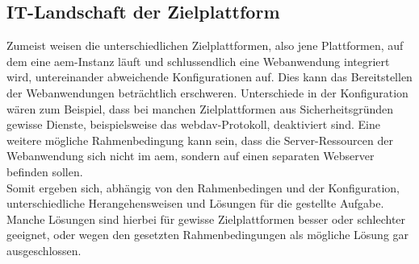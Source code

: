 \subsection{IT-Landschaft der Zielplattform}

Zumeist weisen die unterschiedlichen Zielplattformen, also jene Plattformen, auf dem eine \ac{aem}-Instanz läuft und schlussendlich eine Webanwendung integriert wird, untereinander abweichende Konfigurationen auf. Dies kann das Bereitstellen der Webanwendungen beträchtlich erschweren. Unterschiede in der Konfiguration wären zum Beispiel, dass bei manchen Zielplattformen aus Sicherheitsgründen gewisse Dienste, beispielsweise das \ac{webdav}-Protokoll, deaktiviert sind. Eine weitere mögliche Rahmenbedingung kann sein, dass die Server-Ressourcen der Webanwendung sich nicht im \ac{aem}, sondern auf einen separaten Webserver befinden sollen. \\
Somit ergeben sich, abhängig von den Rahmenbedingen und der Konfiguration, unterschiedliche Herangehensweisen und Lösungen für die gestellte Aufgabe. Manche Lösungen sind hierbei für gewisse Zielplattformen besser oder schlechter geeignet, oder wegen den gesetzten Rahmenbedingungen als mögliche Lösung gar ausgeschlossen.